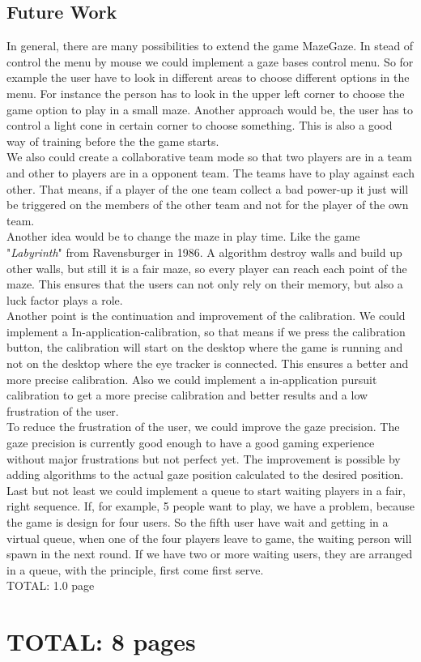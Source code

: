 \documentclass{sigchi}
\begin{document}
\subsection{Future Work}
In general, there are many possibilities to extend the game MazeGaze. In stead of control the menu by mouse we could implement a gaze bases control menu. So for example the user have to look in different areas to choose different options in the menu. For instance the person has to look in the upper left corner to choose the game option to play in a small maze. Another approach would be, the user has to control a light cone in certain corner to choose something. This is also a good way of training before the the game starts.\\ 
We also could create a collaborative team mode so that two players are in a team and other to players are in a opponent team. The teams have to play against each other. That means, if a player of the one team collect a bad power-up it just will be triggered on the members of the other team and not for the player of the own team.\\ 
Another idea would be to change the maze in play time. Like the game "\textit{Labyrinth}" from Ravensburger in 1986. A algorithm destroy walls and build up other walls, but still it is a fair maze, so every player can reach each point of the maze. This ensures that the users can not only rely on their memory, but also a luck factor plays a role.\\
Another point is the continuation and improvement of the calibration. We could implement a In-application-calibration, so that means if we press the calibration button, the calibration will start on the desktop where the game is running and not on the desktop where the eye tracker is connected. This ensures a better and more precise calibration. Also we could implement a  in-application pursuit calibration to get a more precise calibration and better results and a low frustration of the user.\\ 
To reduce the frustration of the user, we could improve the gaze precision. The gaze precision is currently good enough to have a good gaming experience without major frustrations but not perfect yet. The improvement is possible by adding algorithms to the actual gaze position calculated to the desired position. \\
Last but not least we could implement a queue to start waiting players in a fair, right sequence. If, for example, 5 people want to play, we have a problem, because the game is design for four users. So the fifth user have wait and getting in a virtual queue, when one of the four players leave to game, the waiting person will spawn in the next round. If we have two or more waiting users, they are arranged in a queue, with the principle, first come first serve.
\\
TOTAL: 1.0 page

\section{TOTAL: 8 pages}

\balance{}




\end{document}
